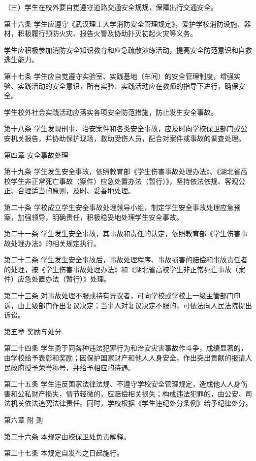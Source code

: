 \documentclass[UTF8,12pt,a4paper]{report}
\begin{document}
（三）学生在校外要自觉遵守道路交通安全规规，保障出行交通安全。

第十六条 学生应遵守《武汉理工大学消防安全管理规定》，爱护学校消防设施、器材，积极履行预防火灾、报告火警及协助扑灭初起火灾等义务。

学生应积极参加消防安全知识教育和应急疏散演练活动，提高安全防范意识和自救逃生能力。

第十七条 学生应自觉遵守实验室、实践基地（车间）的安全管理制度，增强实验、实践活动的安全意识，所有实验、实践活动应在教师的指导下进行，确保安全。

学生校外社会实践活动应落实各项安全防范措施，防止发生安全事故。

第十八条 学生发现刑事、治安案件和各类安全事故，应及时向学校保卫部门或公安机关报告，并协助保护现场，救助受伤人员，配合对案件或事故的调查处理。

第四章 安全事故处理

第十九条 学生发生安全事故，依照教育部《学生伤害事故处理办法》、《湖北省高校学生非正常死亡事故（案件）应急处置办法（暂行）》，坚持依法依规、客观公正、合理适当的原则，及时、妥善地处理。

第二十条 学校成立学生安全事故处理领导小组，制定学生安全事故处理应急预案，加强领导，明确责任，积极稳妥地处理学生安全事故。

第二十一条 学生发生安全事故，其事故和责任的认定，依照教育部《学生伤害事故处理办法》的相关规定执行。

第二十二条 学生发生安全事故后，事故处理程序、事故损害的赔偿和事故责任者的处理，按《学生伤害事故处理办法》和《湖北省高校学生非正常死亡事故（案件）应急处置办法（暂行）》处理。

第二十三条 对事故处理不服或持有异议者，可向学校或学校上一级主管部门申诉，由上级部门作出复议决定；当事人对复议决定不服的，可依法向人民法院提出诉讼。

第五章 奖励与处分

第二十四条 学生勇于同各种违法犯罪行为和治安灾害事故作斗争，成绩显著的，由学校给予表彰和奖励；因保护国家财产和他人人身安全，作出突出贡献的报请人民政府授予荣誉称号，并给予相应的待遇。

第二十五条 学生违反国家法律法规、不遵守学校安全管理规定，造成他人人身伤害和公私财产损失，情节轻微的，应赔偿相关损失；构成违法犯罪的，由公安、司法机关依法追究法律责任。同时，学校根据《学生违纪处分条例》给予纪律处分。

第六章 附 则

第二十六条 本规定由校保卫处负责解释。

第二十七条 本规定自发布之日起施行。
\end{document}
